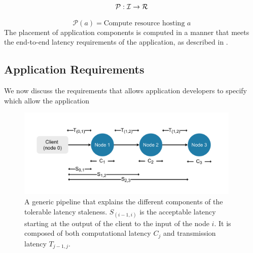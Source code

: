 \begin{equation}
\label{eq:placement_domain_eqn}
\mathcal{P} : \mathcal{I} \rightarrow \mathcal{R}
\end{equation}

\begin{equation}
\label{eq:placement_eqn}
\mathcal{P} \left( a \right) = \text{Compute resource hosting }a
\end{equation}
The placement of application components is computed in a manner that meets the end-to-end latency requirements of the application, as described in \label{sec:oneedge_app_reqs}.

\subsection{Application Requirements}
\label{sec:oneedge_app_reqs}
We now discuss the requirements that \oneedge{} allows application developers to specify which allow the application
\begin{figure}
	\centering
	\includegraphics[width=0.95\textwidth]{figures/oneedge/pipeline_latency.pdf}
    \caption{
    A generic pipeline that explains the different components of the tolerable latency staleness. $S_{(i-1,i)}$ is the acceptable latency starting at the output of the client to the input of the node $i$. It is composed of both computational latency $C_j$ and transmission latency $T_{j-1,j}$. }
	\label{fig:pipeline_lat}
\end{figure}

